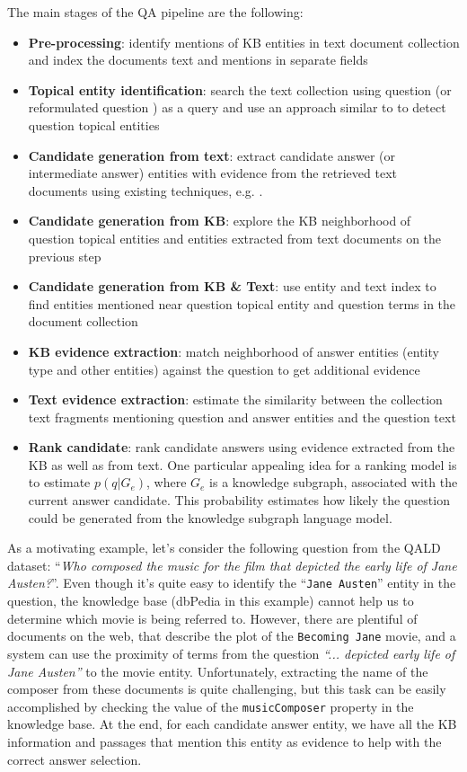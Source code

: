 The main stages of the QA pipeline are the following:
\begin{itemize}
\setlength\itemsep{0em}
\item \textbf{Pre-processing}: identify mentions of KB entities in text document collection and index the documents text and mentions in separate fields
\item \textbf{Topical entity identification}: search the text collection using question (or reformulated question \cite{AgichteinLG01}) as a query and use an approach similar to \cite{cornolti2014smaph} to detect question topical entities
\item \textbf{Candidate generation from text}: extract candidate answer (or intermediate answer) entities with evidence from the retrieved text documents using existing techniques, e.g. \cite{tsai2015web}.
\item \textbf{Candidate generation from KB}: explore the KB neighborhood of question topical entities and entities extracted from text documents on the previous step
\item \textbf{Candidate generation from KB \& Text}: use entity and text index to find entities mentioned near question topical entity and question terms in the document collection
\item \textbf{KB evidence extraction}: match neighborhood of answer entities (entity type and other entities) against the question to get additional evidence
\item \textbf{Text evidence extraction}: estimate the similarity between the collection text fragments mentioning question and answer entities and the question text
\item \textbf{Rank candidate}: rank candidate answers using evidence extracted from the KB as well as from text. One particular appealing idea for a ranking model is to estimate $p(q|G_e)$, where $G_e$ is a knowledge subgraph, associated with the current answer candidate. This probability estimates how likely the question could be generated from the knowledge subgraph language model.
\end{itemize}

As a motivating example, let's consider the following question from the QALD dataset: ``\textit{Who composed the music for the film that depicted the early life of Jane Austen?}''.
Even though it's quite easy to identify the ``\texttt{Jane Austen}'' entity in the question, the knowledge base (dbPedia in this example) cannot help us to determine which movie is being referred to.
However, there are plentiful of documents on the web, that describe the plot of the \texttt{Becoming Jane} movie, and a system can use the proximity of terms from the question \textit{``... depicted early life of Jane Austen''} to the movie entity.
Unfortunately, extracting the name of the composer from these documents is quite challenging, but this task can be easily accomplished by checking the value of the \texttt{musicComposer} property in the knowledge base.
At the end, for each candidate answer entity, we have all the KB information and passages that mention this entity as evidence to help with the correct answer selection.

